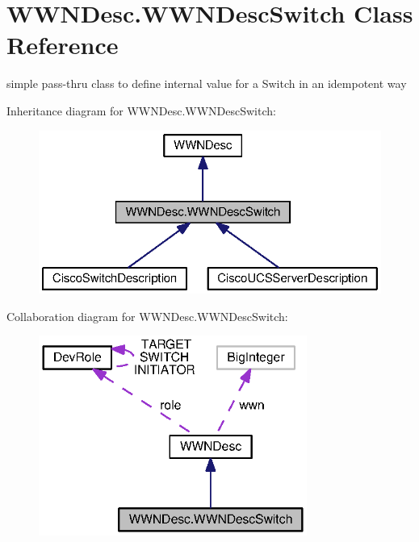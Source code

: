 \section{W\+W\+N\+Desc.\+W\+W\+N\+Desc\+Switch Class Reference}
\label{classorg_1_1smallfoot_1_1wwn_1_1WWNDesc_1_1WWNDescSwitch}


simple pass-\/thru class to define internal value for a Switch in an idempotent way  




Inheritance diagram for W\+W\+N\+Desc.\+W\+W\+N\+Desc\+Switch\+:\nopagebreak
\begin{figure}[H]
\begin{center}
\leavevmode
\includegraphics[width=323pt]{classorg_1_1smallfoot_1_1wwn_1_1WWNDesc_1_1WWNDescSwitch__inherit__graph}
\end{center}
\end{figure}


Collaboration diagram for W\+W\+N\+Desc.\+W\+W\+N\+Desc\+Switch\+:\nopagebreak
\begin{figure}[H]
\begin{center}
\leavevmode
\includegraphics[width=249pt]{classorg_1_1smallfoot_1_1wwn_1_1WWNDesc_1_1WWNDescSwitch__coll__graph}
\end{center}
\end{figure}
